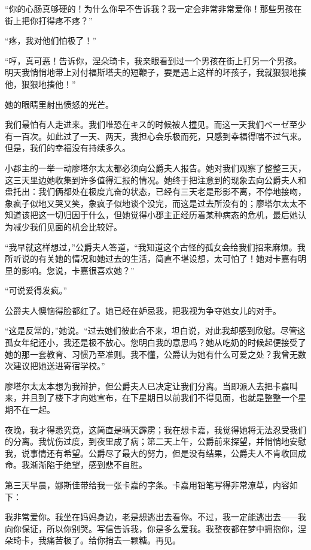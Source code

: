 \documentclass[12pt, UTF8]{ctexbook}
\begin{document}
\par “你的心肠真够硬的！为什么你早不告诉我？我一定会非常非常爱你！那些男孩在街上把你打得疼不疼？”
\par “疼，我对他们怕极了！”
\par “哼，真可恶！告诉你，涅朵琦卡，我亲眼看到过一个男孩在街上打另一个男孩。明天我悄悄地带上对付福斯塔夫的短鞭子，要是遇上这样的坏孩子，我就狠狠地揍他，狠狠地揍他！”
\par 她的眼睛里射出愤怒的光芒。
\par 我们最怕有人走进来。我们唯恐在キス的时候被人撞见。而这一天我们ベーゼ至少有一百次。如此过了一天、两天，我担心会乐极而死，只感到幸福得喘不过气来。但是，我们的幸福没有持续多久。
\par 小郡主的一举一动廖塔尔太太都必须向公爵夫人报告。她对我们观察了整整三天，这三天里边她收集到许多值得汇报的情况。她终于把注意到的现象去向公爵夫人和盘托出：我们俩都处在极度亢奋的状态，已经有三天老是形影不离，不停地接吻，象疯子似地又哭又笑，象疯子似地谈个没完，而这是过去所没有的；廖塔尔太太不知道该把这一切归因于什么，但她觉得小郡主正经历着某种病态的危机，最后她认为减少我们见面的机会比较好。
\par “我早就这样想过，”公爵夫人答道，“我知道这个古怪的孤女会给我们招来麻烦。我所听说的有关她的情况和她过去的生活，简直不堪设想，太可怕了！她对卡嘉有明显的影响。您说，卡嘉很喜欢她？”
\par “可说爱得发疯。”
\par 公爵夫人懊恼得脸都红了。她已经在妒忌我，把我视为争夺她女儿的对手。
\par “这是反常的，”她说。“过去她们彼此合不来，坦白说，对此我却感到欣慰。尽管这孤女年纪还小，我还是极不放心。您明白我的意思吗？她从吃奶的时候起便接受了她的那一套教育、习惯乃至准则。我不懂，公爵认为她有什么可爱之处？我曾无数次建议把她送进寄宿学校。”
\par 廖塔尔太太本想为我辩护，但公爵夫人已决定让我们分离。当即派人去把卡嘉叫来，并且到了楼下才向她宣布，在下星期日以前我们不得见面，也就是整整一个星期不在一起。
\par 夜晚，我才得悉究竟，这简直是晴天霹雳；我在想卡嘉，我觉得她将无法忍受我们的分离。我忧伤过度，到夜里成了病；第二天上午，公爵前来探望，并悄悄地安慰我，说事情还有希望。公爵尽了最大的努力，但是没有结果，公爵夫人不肯收回成命。我渐渐陷于绝望，感到悲不自胜。
\par 第三天早晨，娜斯佳带给我一张卡嘉的字条。卡嘉用铅笔写得非常潦草，内容如下：
\par 我非常爱你。我坐在妈妈身边，老是想逃出去看你。不过，我一定能逃出去——我向你保证，所以你别哭。写信告诉我，你是多么爱我。我整夜都在梦中拥抱你，涅朵琦卡，我痛苦极了。给你捎去一颗糖。再见。
\end{document}
